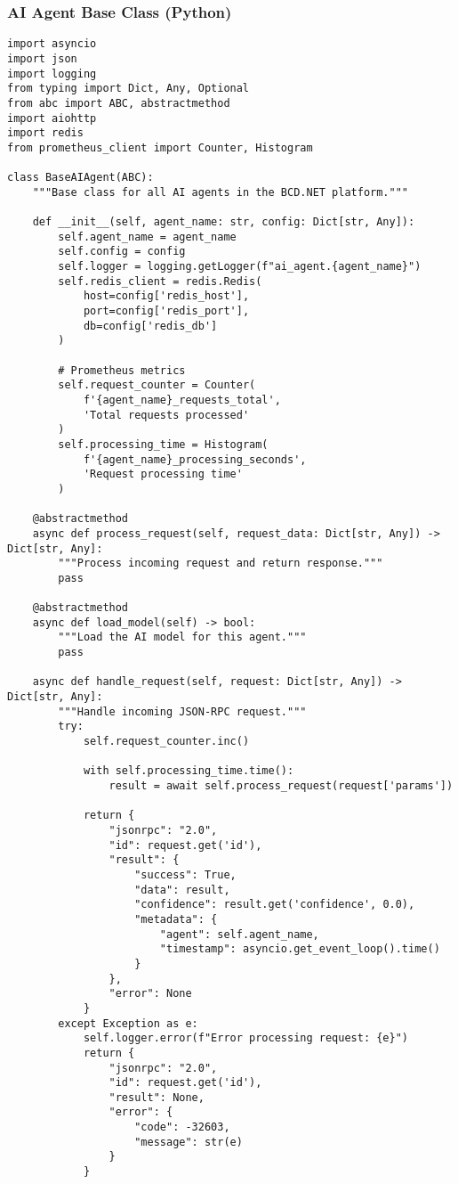 \subsubsection{AI Agent Base Class (Python)}

\begin{verbatim}
import asyncio
import json
import logging
from typing import Dict, Any, Optional
from abc import ABC, abstractmethod
import aiohttp
import redis
from prometheus_client import Counter, Histogram

class BaseAIAgent(ABC):
    """Base class for all AI agents in the BCD.NET platform."""
    
    def __init__(self, agent_name: str, config: Dict[str, Any]):
        self.agent_name = agent_name
        self.config = config
        self.logger = logging.getLogger(f"ai_agent.{agent_name}")
        self.redis_client = redis.Redis(
            host=config['redis_host'],
            port=config['redis_port'],
            db=config['redis_db']
        )
        
        # Prometheus metrics
        self.request_counter = Counter(
            f'{agent_name}_requests_total',
            'Total requests processed'
        )
        self.processing_time = Histogram(
            f'{agent_name}_processing_seconds',
            'Request processing time'
        )
        
    @abstractmethod
    async def process_request(self, request_data: Dict[str, Any]) -> Dict[str, Any]:
        """Process incoming request and return response."""
        pass
    
    @abstractmethod
    async def load_model(self) -> bool:
        """Load the AI model for this agent."""
        pass
    
    async def handle_request(self, request: Dict[str, Any]) -> Dict[str, Any]:
        """Handle incoming JSON-RPC request."""
        try:
            self.request_counter.inc()
            
            with self.processing_time.time():
                result = await self.process_request(request['params'])
            
            return {
                "jsonrpc": "2.0",
                "id": request.get('id'),
                "result": {
                    "success": True,
                    "data": result,
                    "confidence": result.get('confidence', 0.0),
                    "metadata": {
                        "agent": self.agent_name,
                        "timestamp": asyncio.get_event_loop().time()
                    }
                },
                "error": None
            }
        except Exception as e:
            self.logger.error(f"Error processing request: {e}")
            return {
                "jsonrpc": "2.0",
                "id": request.get('id'),
                "result": None,
                "error": {
                    "code": -32603,
                    "message": str(e)
                }
            }
    

\end{verbatim}
